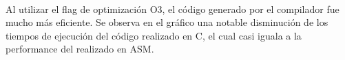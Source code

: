 \documentclass[a4paper]{article}
\begin{document}

\noindent%
\begin{minipage}{\linewidth}%
\end{minipage}
\ \

Al utilizar el flag de optimización O3, el código generado por el compilador fue mucho más eficiente. Se observa en el gráfico una notable disminución de los tiempos de ejecución del código realizado en C, el cual casi iguala a la performance del realizado en ASM.

\end{document}
